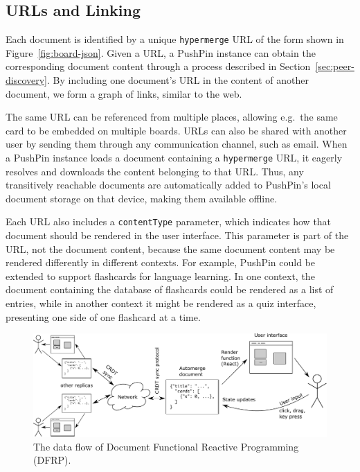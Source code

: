 \documentclass[sigplan,10pt]{acmart}
\begin{document}
\subsection{URLs and Linking}\label{sec:urls}

Each document is identified by a unique \texttt{hypermerge} URL of the form shown in Figure~\ref{fig:board-json}.
Given a URL, a PushPin instance can obtain the corresponding document content through a process described in Section~\ref{sec:peer-discovery}.
By including one document's URL in the content of another document, we form a graph of links, similar to the web.

The same URL can be referenced from multiple places, allowing e.g.\ the same card to be embedded on multiple boards.
URLs can also be shared with another user by sending them through any communication channel, such as email.
When a PushPin instance loads a document containing a \texttt{hypermerge} URL, it eagerly resolves and downloads the content belonging to that URL.
Thus, any transitively reachable documents are automatically added to PushPin's local document storage on that device, making them available offline.

Each URL also includes a \texttt{contentType} parameter, which indicates how that document should be rendered in the user interface.
This parameter is part of the URL, not the document content, because the same document content may be rendered differently in different contexts.
For example, PushPin could be extended to support flashcards for language learning.
In one context, the document containing the database of flashcards could be rendered as a list of entries, while in another context it might be rendered as a quiz interface, presenting one side of one flashcard at a time.


\begin{figure}
\centering
\includegraphics{document-frp.pdf}
\caption{The data flow of Document Functional Reactive Programming (DFRP).}
\label{fig:document-frp}
\end{figure}
\end{document}

